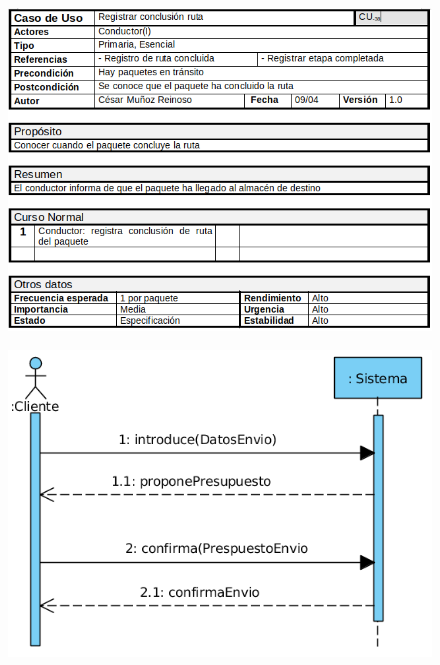 \begin{figure}[H]
	\centering
	\includegraphics[width=16cm]{38}
\end{figure}
\begin{figure}[H]
	\centering
	\includegraphics[width=16cm]{39}
\end{figure}
